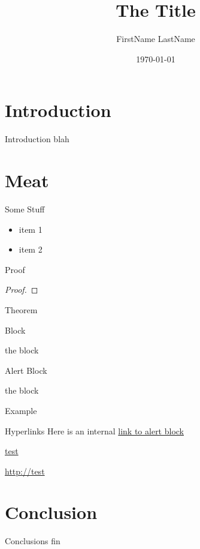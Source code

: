 \documentclass{beamer}
\title{The Title}
\author[LastName]{FirstName LastName}
\institute{University of Arizona}
\date{\today}
\begin{document}
\begin{frame}
  \titlepage
\end{frame}

\begin{frame}
  \tableofcontents
\end{frame}

\section{Introduction}
\label{sec:intro}

\begin{frame}{Introduction}
blah
\end{frame}

\section{Meat}
\label{sec:meat}

\begin{frame}{Some Stuff}
  \begin{itemize}
  \item item 1
  \item item 2
  \end{itemize}
\end{frame}

\begin{frame}{Proof}
  \begin{proof}
    \lipsum[4]
  \end{proof}
\end{frame}

\begin{frame}{Theorem}
  \begin{theorem}
    \lipsum[4]
  \end{theorem}
\end{frame}

\begin{frame}{Block}
\begin{block}{the block}
\lipsum[2]
\end{block}
\end{frame}

\begin{frame}{Alert Block}
\label{alertblock}
\begin{alertblock}{the block}
\lipsum[2]
\end{alertblock}
\end{frame}

\begin{frame}{Example}
\begin{example}
\lipsum[5]
\end{example}
\end{frame}

\begin{frame}{Hyperlinks}
Here is an internal
\hyperlink{alertblock}{link to alert block}


\href{http://test}{test}

\url{http://test}
\end{frame}

\section{Conclusion}
\label{sec:conclusion}

\begin{frame}{Conclusions}
fin
\end{frame}
\end{document}
